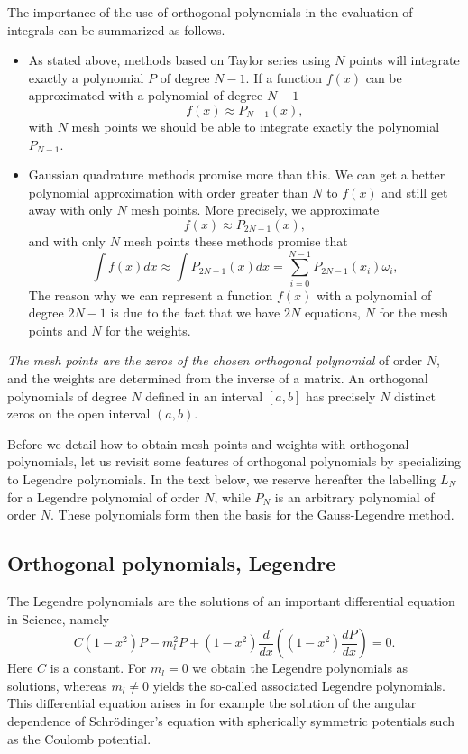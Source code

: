 The importance of the use of orthogonal polynomials in the evaluation
of integrals can be summarized as follows.
\begin{itemize} 
  \item As stated above, methods based on Taylor series using $N$ points will
        integrate exactly a polynomial $P$ of degree $N-1$. If a function $f(x)$
        can be approximated with a polynomial of degree $N-1$
        \[ 
          f(x)\approx P_{N-1}(x), 
        \]
         with $N$ mesh points we should be able to integrate exactly the 
         polynomial $P_{N-1}$. 
   \item Gaussian quadrature methods promise more than this. We can get a better
         polynomial approximation with order greater than $N$  to $f(x)$ and still
         get away with only $N$ mesh points. More precisely, we approximate
         \[
            f(x) \approx P_{2N-1}(x),
         \]
         and with only $N$ mesh points these methods promise that 
         \[
            \int f(x)dx \approx \int P_{2N-1}(x)dx=\sum_{i=0}^{N-1} P_{2N-1}(x_i)\omega_i,
         \]
         The reason why we can represent a function $f(x)$ with a polynomial of degree
         $2N-1$ is due to the fact that we have $2N$ equations, $N$ for the mesh points and $N$
         for the weights. 
\end{itemize}
{\em The mesh points are the zeros  of the chosen  orthogonal polynomial} of
order $N$, and the weights are determined from the inverse of a matrix.
An orthogonal polynomials of degree $N$ defined in an interval $[a,b]$
has precisely $N$ distinct zeros on the open interval $(a,b)$. 
 
Before we detail how to obtain mesh points and weights with orthogonal 
polynomials, let us revisit some features of orthogonal polynomials
by specializing to Legendre polynomials. In the text below, we reserve 
hereafter the labelling
$L_N$ for a Legendre polynomial of order $N$, while $P_N$ is an arbitrary polynomial
of order $N$. 
These polynomials form then the basis for the Gauss-Legendre method. 

\subsection{Orthogonal polynomials, Legendre} 


The Legendre polynomials are the solutions of an important
differential equation in Science, namely
\[
C(1-x^2)P-m_l^2P+(1-x^2)\frac{d}{dx}\left((1-x^2)\frac{dP}{dx}\right)=0.
\]
Here $C$ is a constant. For $m_l=0$ we obtain the Legendre polynomials
as solutions, whereas $m_l \ne 0$ yields the so-called associated Legendre
polynomials. This differential equation arises in for example the solution
of the angular dependence of Schr\"odinger's 
equation with spherically symmetric potentials such as
the Coulomb potential. 

